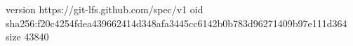 version https://git-lfs.github.com/spec/v1
oid sha256:f20c4254fdea439662414d348afa3445cc6142b0b783d96271409b97e111d364
size 43840

